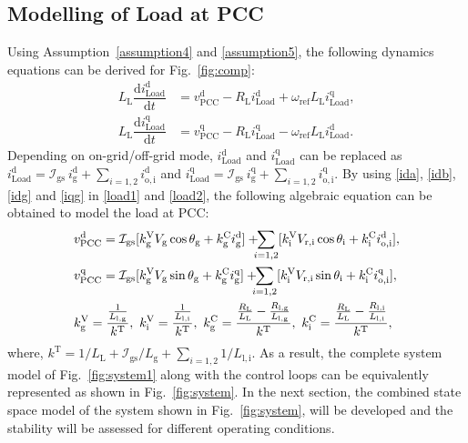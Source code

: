 \documentclass[journal]{IEEEtran}
\begin{document}
\subsection{Modelling of Load at PCC}
Using Assumption~\ref{assumption4} and \ref{assumption5}, the following dynamics equations can be derived for Fig.~\ref{fig:comp}:
\begin{align}
    L_\mathrm{L}\dfrac{\mathrm{d}i_\mathrm{Load}^\mathrm{d}}{\mathrm{d}t} &= v_\mathrm{PCC}^\mathrm{d}-R_\mathrm{L}i_\mathrm{Load}^\mathrm{d} + \omega_\mathrm{ref}L_\mathrm{L}i_\mathrm{Load}^\mathrm{q}, \label{load1}\\
    L_\mathrm{L}\dfrac{\mathrm{d}i_\mathrm{Load}^\mathrm{q}}{\mathrm{d}t} &= v_\mathrm{PCC}^\mathrm{q}-R_\mathrm{L}i_\mathrm{Load}^\mathrm{q} - \omega_\mathrm{ref}L_\mathrm{L}i_\mathrm{Load}^\mathrm{d}. \label{load2}
\end{align}
Depending on on-grid/off-grid mode, $i_\mathrm{Load}^\mathrm{d}$ and $i_\mathrm{Load}^\mathrm{q}$ can be replaced as $i_\mathrm{Load}^\mathrm{d}=\mathcal{I}_\mathrm{gs}~i_\mathrm{g}^\mathrm{d}+\sum\limits_{i=1,2}i_\mathrm{o,i}^\mathrm{d}$ and $i_\mathrm{Load}^\mathrm{q}=\mathcal{I}_\mathrm{gs}~i_\mathrm{g}^\mathrm{q}+\sum\limits_{i=1,2}i_\mathrm{o,i}^\mathrm{q}$. By using \eqref{ida}, \eqref{idb}, \eqref{idg} and \eqref{iqg} in \eqref{load1} and \eqref{load2}, the following algebraic equation can be obtained to model the load at PCC:
\begin{align}\label{load}
    &v_\mathrm{PCC}^\mathrm{d}=\mathcal{I}_\mathrm{gs}[k^\mathrm{V}_\mathrm{g}V_\mathrm{g}\cos\theta_\mathrm{g}+k^\mathrm{C}_\mathrm{g}i_\mathrm{g}^\mathrm{d}]+\hspace*{-2mm}\sum_{i=1,2}[k^\mathrm{V}_\mathrm{i}V_\mathrm{r,i}\cos\theta_\mathrm{i}+k^\mathrm{C}_\mathrm{i}i_\mathrm{o,i}^\mathrm{d}], \\
    &v_\mathrm{PCC}^\mathrm{q}=\mathcal{I}_\mathrm{gs}[k^\mathrm{V}_\mathrm{g}V_\mathrm{g}\sin\theta_\mathrm{g}+k^\mathrm{C}_\mathrm{g}i_\mathrm{g}^\mathrm{q}]+\hspace*{-2mm}\sum_{i=1,2}[k^\mathrm{V}_\mathrm{i}V_\mathrm{r,i}\sin\theta_\mathrm{i}+k^\mathrm{C}_\mathrm{i}i_\mathrm{o,i}^\mathrm{q}], \\
    &k^\mathrm{V}_\mathrm{g}=\frac{\frac{1}{L_\mathrm{l,g}}}{k^\mathrm{T}},~k^\mathrm{V}_\mathrm{i}=\frac{\frac{1}{L_\mathrm{l,i}}}{k^\mathrm{T}},~k^\mathrm{C}_\mathrm{g}=\frac{\frac{R_\mathrm{L}}{L_\mathrm{L}}-\frac{R_\mathrm{l,g}}{L_\mathrm{l,g}}}{k^\mathrm{T}},~k^\mathrm{C}_\mathrm{i}=\frac{\frac{R_\mathrm{L}}{L_\mathrm{L}}-\frac{R_\mathrm{l,i}}{L_\mathrm{l,i}}}{k^\mathrm{T}}, \nonumber
\end{align}
where, $k^\mathrm{T}=1/L_\mathrm{L}+\mathcal{I}_\mathrm{gs}/L_\mathrm{g}+\sum\limits_{i=1,2}1/L_\mathrm{l,i}$.
As a result, the complete system model of Fig.~\ref{fig:system1} along with the control loops can be equivalently represented as shown in Fig.~\ref{fig:system}. In the next section, the combined state space model of the system shown in Fig.~\ref{fig:system}, will be developed and the stability will be assessed for different operating conditions.
\end{document}
